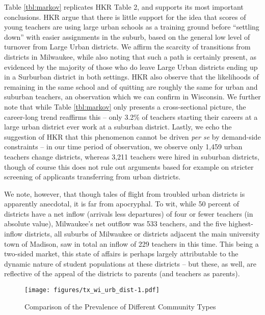 \documentclass[12pt,]{article}
\begin{document}
Table \ref{tbl:markov} replicates HKR Table 2, and supports its most
important conclusions. HKR argue that there is little support for the
idea that scores of young teachers are using large urban schools as a
training ground before ``settling down'' with easier assignments in the
suburb, based on the general low level of turnover from Large Urban
districts. We affirm the scarcity of transitions from districts in
Milwaukee, while also noting that such a path is certainly present, as
evidenced by the majority of those who do leave Large Urban districts
ending up in a Surburban district in both settings. HKR also observe
that the likelihoods of remaining in the same school and of quitting are
roughly the same for urban and suburban teachers, an observation which
we can confirm in Wisconsin. We further note that while Table
\ref{tbl:markov} only presents a cross-sectional picture, the
career-long trend reaffirms this -- only 3.2\% of teachers starting
their careers at a large urban district ever work at a suburban
district. Lastly, we echo the suggestion of HKR that this phenomenon
cannot be driven \emph{per se} by demand-side constraints -- in our time
period of observation, we observe only 1,459 urban teachers change
districts, whereas 3,211 teachers were hired in suburban districts,
though of course this does not rule out arguments based for example on
stricter screening of applicants transferring from urban districts.

We note, however, that though tales of flight from troubled urban
districts is apparently anecdotal, it is far from apocryphal. To wit,
while 50 percent of districts have a net inflow (arrivals less
departures) of four or fewer teachers (in absolute value), Milwaukee's
net outflow was 533 teachers, and the five highest-inflow districts, all
suburbs of Milwaukee or districts adjacent the main university town of
Madison, saw in total an inflow of 229 teachers in this time. This being
a two-sided market, this state of affairs is perhaps largely
attributable to the dynamic nature of student populations at these
districts -- but these, as well, are reflective of the appeal of the
districts to parents (and teachers as parents).

\begin{figure}[htbp]
\centering
\texttt{[image: figures/tx\_wi\_urb\_dist-1.pdf]}
\caption{\label{fig:ti_wi_urb}Comparison of the Prevalence of Different
Community Types}
\end{figure}
\end{document}
